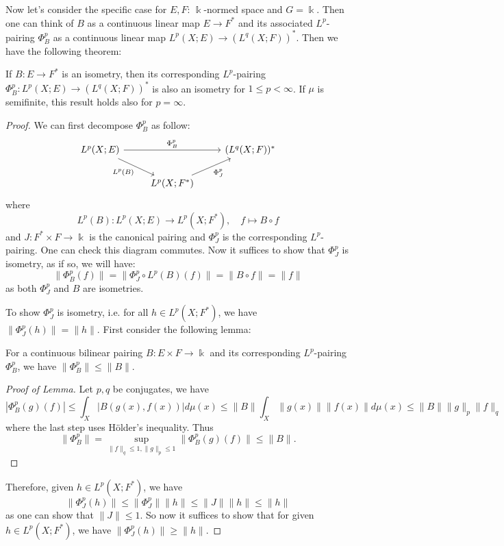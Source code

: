 Now let's consider the specific case for $E,F$: $\Bbbk$-normed space and $G=\Bbbk$. Then one 
can think of $B$ as a continuous linear map $E\rightarrow F^*$ and its associated $L^p$-pairing
$\Phi_B^p$ as a continuous linear map $L^p(X;E)\rightarrow (L^q(X;F))^*$. Then we have the 
following theorem:
\begin{theorem}
If $B: E\rightarrow F^*$ is an isometry, then its corresponding $L^p$-pairing
 $\Phi_B^p:L^p(X;E)\rightarrow (L^q(X;F))^*$ is also an isometry for $1\leq p<\infty$. 
If $\mu$ is semifinite, this result holds also for $p=\infty$.
\end{theorem}
\begin{proof}
We can first decompose $\Phi_B^p$ as follow:
\begin{equation*}
\begin{tikzcd}
L^p(X;E) \arrow[rd, "L^p(B)"'] \arrow[rr, "\Phi_B^p"] &                               & (L^q(X;F))^* \\
                                                    & L^p(X;F^*) \arrow[ru, "\Phi_J^p"'] &             
\end{tikzcd}
\end{equation*}
where 
\begin{equation*}
    L^p(B) : L^p(X;E)\rightarrow L^p(X;F^*),\quad f\mapsto B\circ f
\end{equation*}
and $J:F^*\times F\rightarrow \Bbbk$ is the canonical pairing and $\Phi_J^p$ is the corresponding $L^p$-pairing. One 
can check this diagram commutes. Now it suffices to show that $\Phi_J^p$ is isometry, as if so, we will have:
\begin{equation*}
    \|\Phi_B^p (f)\|=\|\Phi_J^p\circ L^p(B)(f)\|=\|B\circ f\|=\|f\|
\end{equation*}
as both $\Phi_J^p$ and $B$ are isometries.

To show $\Phi_J^p$ is isometry, i.e. for all $h\in L^p(X;F^*)$, we have $\|\Phi_J^p(h)\|=\|h\|$. First 
consider the following lemma:
\begin{lemma}
For a continuous bilinear pairing $B:E\times F\rightarrow \Bbbk$ and its
corresponding $L^p$-pairing $\Phi_B^p$, we have $\|\Phi_B^p\|\leq \|B\|$.
\end{lemma}
\begin{proof}[Proof of Lemma]
Let $p,q$ be conjugates, we have
\begin{equation*}
    |\Phi_B^p(g)(f)|\leq \int_X |B(g(x),f(x))|d\mu(x)\leq \|B\|\int_X\|g(x)\|\|f(x)\| d\mu(x)\leq \|B\|\|g\|_p\|f\|_q
\end{equation*}
where the last step uses H\"{o}lder's inequality. Thus
\begin{equation*}
    \|\Phi_B^p\|=\sup_{\|f\|_q\leq 1, \|g\|_p\leq 1}\|\Phi_B^p(g)(f)\|\leq \|B\|.
\end{equation*}
\end{proof}
Therefore, given $h\in L^p(X;F^*)$, we have 
\begin{equation*}
    \|\Phi_J^p(h)\|\leq \|\Phi_J^p\|\|h\|\leq \|J\|\|h\|\leq \|h\|
\end{equation*}
as one can show that $\|J\|\leq 1$. So now it suffices to show that for given $h\in L^p(X;F^*)$, we 
have $\|\Phi_J^p(h)\|\geq \|h\|$. 


\end{proof}
